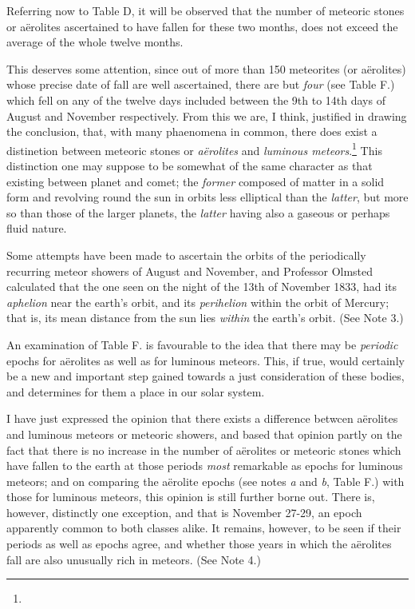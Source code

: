 \documentclass[a4paper, 12pt, oneside]{article}
\begin{document}
Referring now to Table D, it will be observed that the number of meteoric stones or aërolites ascertained to have fallen for these two months, does not exceed the average of the whole twelve months.

This deserves some attention, since out of more than 150 meteorites (or aërolites) whose precise date of fall are well ascertained, there are but \emph{four} (see Table F.) which fell on any of the twelve days included between the 9th to 14th days of August and November respectively. From this we are, I think, justified in drawing the conclusion, that, with many phaenomena in common, there does exist a distinetion between meteoric stones or \emph{aërolites} and \emph{luminous meteors}.\footnote{} This distinction one may suppose to be somewhat of the same character as that existing between planet and comet; the \emph{former} composed of matter in a solid form and revolving round the sun in orbits less elliptical than the \emph{latter}, but more so than those of the larger planets, the \emph{latter} having also a gaseous or perhaps fluid nature.

Some attempts have been made to ascertain the orbits of the periodically recurring meteor showers of August and November, and Professor Olmsted calculated that the one seen on the night of the 13th of November 1833, had its \emph{aphelion} near the earth's orbit, and its \emph{perihelion} within the orbit of Mercury; that is, its mean distance from the sun lies \emph{within} the earth's orbit. (See Note 3.)

An examination of Table F. is favourable to the idea that there may be \emph{periodic} epochs for aërolites as well as for luminous meteors. This, if true, would certainly be a new and important step gained towards a just consideration of these bodies, and determines for them a place in our solar system.

I have just expressed the opinion that there exists a difference betwcen aërolites and luminous meteors or meteoric showers, and based that opinion partly on the fact that there is no increase in the number of aërolites or meteoric stones which have fallen to the earth at those periods \emph{most} remarkable as epochs for luminous meteors; and on comparing the aërolite epochs (see notes \emph{a} and \emph{b}, Table F.) with those for luminous meteors, this opinion is still further borne out. There is, however, distinctly one exception, and that is November 27-29, an epoch apparently common to both classes alike. It remains, however, to be seen if their periods as well as epochs agree, and whether those years in which the aërolites fall are also unusually rich in meteors. (See Note 4.)
\end{document}
